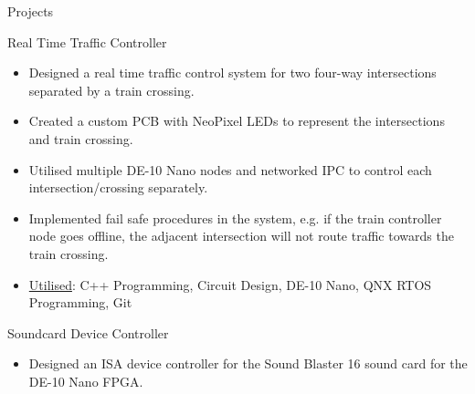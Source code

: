 \documentclass[]{mcdowellcv}
\begin{document}
\begin{cvsection}{Projects}
		\begin{cvsubsection}{Real Time Traffic Controller}{}{}
			\begin{itemize}
				\item Designed a real time traffic control system for two four-way intersections separated by a train crossing.
				\item Created a custom PCB with NeoPixel LEDs to represent the intersections and train crossing.
				\item Utilised multiple DE-10 Nano nodes and networked IPC to control each intersection/crossing separately.
				\item Implemented fail safe procedures in the system, e.g. if the train controller node goes offline, the adjacent intersection will not route traffic towards the train crossing.
				\item \underline{Utilised}: C++ Programming, Circuit Design, DE-10 Nano, QNX RTOS Programming, Git
			\end{itemize}
		\end{cvsubsection}
\iffalse
-Worked in a team of four to develop a real time traffic controller system for two four-way intersections separated by a train crossing.
-The intersections were represented by a custom PCB our team designed and created, utilising NeoPixel LEDs as our traffic lights and push buttons as our pedestrian buttons. 
-The system itself was controlled by four separate micro-controller nodes (DE-10 Nano) running the QNX real time operating system, one for each intersection, one for the train crossing and one more as the controlling/watchdog system. 
-Each node was heavily multi threaded and networked IPC was utilised to communicate between nodes. 
-Node failure was accounted for in the design, with fail safe mechanisms employed to stop potentially dangerous scenarios, e.g. if the train crossing controller node went offline, the adjacent intersections would not route traffic towards the crossing.
-The lights realistically change, transitioning from green to yellow to red in real time, with the transitions being triggered by either timers, or the pedestrian buttons depending on the mode.
-The controller node featured a command line interface, which allowed individual control over each other nodes mode, light configuration and timing. 
\fi
		\begin{cvsubsection}{Soundcard Device Controller}{}{}
			\begin{itemize}
				\item Designed an ISA device controller for the Sound Blaster 16 sound card for the DE-10 Nano FPGA.

\end{itemize}
\end{cvsubsection}
\end{cvsection}
\end{document}
